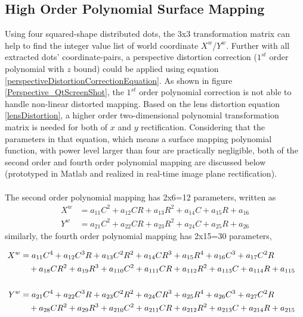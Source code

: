 \subsection{High Order Polynomial Surface Mapping}
\label{sectionHighOrderPolynomialSurfaceMapping}
%
Using four squared-shape distributed dots, the 3x3 transformation matrix can help to find the integer value list of  world coordinate \(X^w\)/\(Y^w\). Further with all extracted dots' coordinate-pairs, a perspective distortion correction (\(1^{st}\) order polynomial with \(z\) bound) could be applied using equation \ref{perspectiveDistortionCorrectionEquation}. As shown in figure \ref{Perspective_QtScreenShot}, the \(1^{st}\) order polynomial correction is not able to handle non-linear distorted mapping. Based on the lens distortion equation \ref{lensDistortion}, a higher order two-dimensional polynomial transformation matrix is needed for both of \(x\) and \(y\) rectification. Considering that the parameters in that equation, which means a surface mapping polynomial function, with power level larger than four are practically negligible, both of the second order and fourth order polynomial mapping are discussed below (prototyped in Matlab and realized in real-time image plane rectification).\\\\%
%
The second order polynomial mapping has 2x6=12 parameters, written as %
%
\begin{equation}
%
\begin{aligned}
X^w &=  a_{11}C^2 + a_{12}CR + a_{13}R^2 + a_{14}C + a_{15}R + a_{16}
\\%
Y^w &=  a_{21}C^2 + a_{22}CR + a_{23}R^2 + a_{24}C + a_{25}R + a_{26}
\end{aligned}
\label{secondOrderPolynomial}
%
\end{equation}%
%
similarly, the fourth order polynomial mapping has 2x15=30 parameters,\par%
%
\begin{equation}
%
\hspace*{-0.3cm}%
\begin{aligned}
X^w &=  a_{11}C^4 + a_{12}C^3R + a_{13}C^2R^2 + a_{14}CR^3 + a_{15}R^4 + a_{16}C^3 + a_{17}C^2R \\%
&\,\,\,\,\,\,+ a_{18}CR^2 + a_{19}R^3 + a_{110}C^2 + a_{111}CR + a_{112}R^2 + a_{113}C + a_{114}R + a_{115}
\\\\%
Y^w &=  a_{21}C^4 + a_{22}C^3R + a_{23}C^2R^2 + a_{24}CR^3 + a_{25}R^4 + a_{26}C^3 + a_{27}C^2R \\%
&\,\,\,\,\,\,+ a_{28}CR^2 + a_{29}R^3 + a_{210}C^2 + a_{211}CR + a_{212}R^2 + a_{213}C + a_{214}R + a_{215}
\end{aligned}
\label{fourthOrderPolynomial}
%
\end{equation}%
